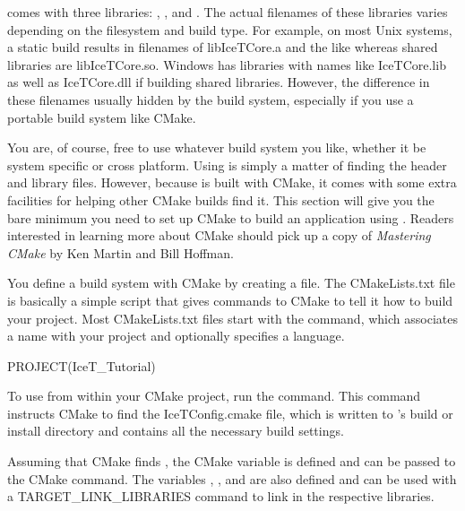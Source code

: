 \IceT comes with three libraries:
,
, and
.  The actual filenames of these
libraries varies depending on the filesystem and build type.  For example,
on most Unix systems, a static build results in filenames of
libIceTCore.a and the like whereas shared libraries
are libIceTCore.so.  Windows has libraries with names
like IceTCore.lib as well as
IceTCore.dll if building shared libraries.  However,
the difference in these filenames usually hidden by the build system,
especially if you use a portable build system like CMake.

You are, of course, free to use whatever build system you like, whether it
be system specific or cross platform.  Using \IceT is simply a matter of
finding the header and library files.  However, because \IceT is built with
CMake, it comes with some extra facilities for helping other
CMake builds find it.  This section will give you the bare minimum you need
to set up CMake to build an application using \IceT.  Readers interested in
learning more about CMake should pick up a copy of \emph{Mastering CMake}
by Ken Martin and Bill Hoffman.

You define a build system with CMake by creating a
 file.  The CMakeLists.txt
file is basically a simple script that gives commands to CMake to tell it
how to build your project.  Most CMakeLists.txt files start with the
 command, which associates a name with your project and
optionally specifies a language.
\begin{code}
PROJECT(IceT_Tutorial)
\end{code}

To use \IceT from within your CMake project, run the
 command.  This command instructs
CMake to find the IceTConfig.cmake file, which is
written to \IceT's build or install directory and contains all the
necessary build settings.

Assuming that CMake finds \IceT, the CMake variable
 is defined and can be passed to the
 CMake command.
The variables , , and
 are also defined and can be used with a
TARGET\_LINK\_LIBRARIES command to link in
the respective \IceT libraries.

